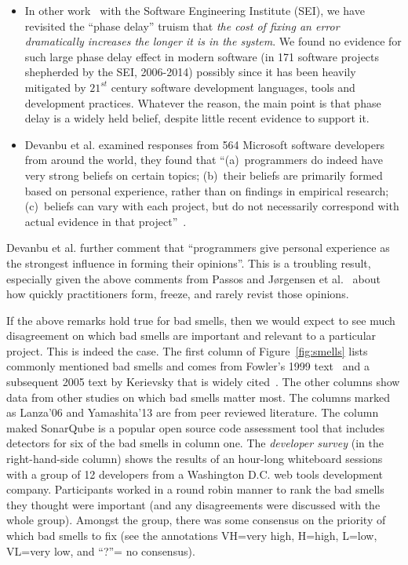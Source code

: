 \documentclass[twocolumn,5p]{elsarticle}
\newcommand{\bi}{\begin{itemize}[leftmargin=0.4cm]}
\newcommand{\ei}{\end{itemize}}
\newcommand{\fig}[1]{Figure~\ref{fig:#1}}
\theoremstyle{break}
\begin{document}
\bi
\item
In other work~\cite{me16phase} with the Software Engineering Institute (SEI), we have revisited
the ``phase delay'' truism that {\em the cost of fixing an error dramatically increases the longer it is in the system}. 
We found no evidence for such large   phase delay effect in modern
software (in 171 software projects shepherded
by the SEI, 2006-2014) possibly since it has been  heavily mitigated by $21^{st}$ century software development languages, tools and development practices. 
Whatever the reason, the main point  is that phase delay is a widely
held belief, despite little recent evidence to support it.
\item
Devanbu et al. examined responses from 564 Microsoft software developers from around
the world, they found that  ``(a)~programmers do indeed have very
strong beliefs on certain topics; (b)~their beliefs are primarily formed
based on personal experience, rather than on findings in empirical
research; (c)~beliefs can vary with each project, but do not necessarily
correspond with actual evidence in that project''~\cite{prem16}.
\ei
Devanbu et al. further  comment that ``programmers give personal experience
as the strongest influence in forming their opinions''. This is a troubling
result, especially given the above comments from Passos and  J{\o}rgensen et al.~\cite{passos11,jorgensen09} about how quickly practitioners form, freeze, and rarely revist those opinions.





If the above remarks hold true for bad smells, then we would expect
to see much disagreement on which bad smells are important and relevant
to  a particular project. This is indeed the case.
The first column of \fig{smells} 
lists  commonly mentioned bad smells and comes from Fowler's 1999 text~\cite{fowler99} and a subsequent 2005 text by Kerievsky that is widely cited~\cite{Kerievsky2005}.
The other
columns show data from other studies on which bad smells matter most.
The columns marked as Lanza'06 and Yamashita'13 are from peer reviewed literature. The column maked SonarQube is a popular open source
code assessment tool that includes detectors for six of the bad smells
in column one. 
The {\em developer survey} (in the right-hand-side column) shows the results of an hour-long whiteboard sessions with a group of 12 developers from a Washington
    D.C. web tools development company. Participants
    worked in a round robin manner to rank the bad smells they thought were
    important (and any disagreements were discussed with the whole group).
     Amongst the group, there was  some
    consensus on  the priority of which bad smells to fix
    (see the annotations VH=very high,
    H=high, L=low, VL=very low, and ``?''= no consensus).  
   
\end{document}
